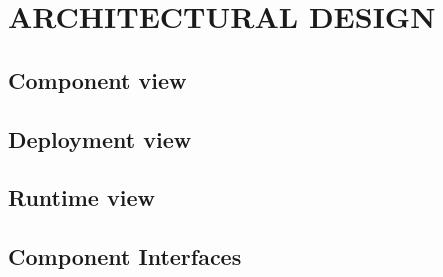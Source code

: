 \section{ARCHITECTURAL DESIGN}

	

	

	\subsection{Component view}

	\subsection{Deployment view}

	\subsection{Runtime view}
	
	\subsection{Component Interfaces}
	
	
